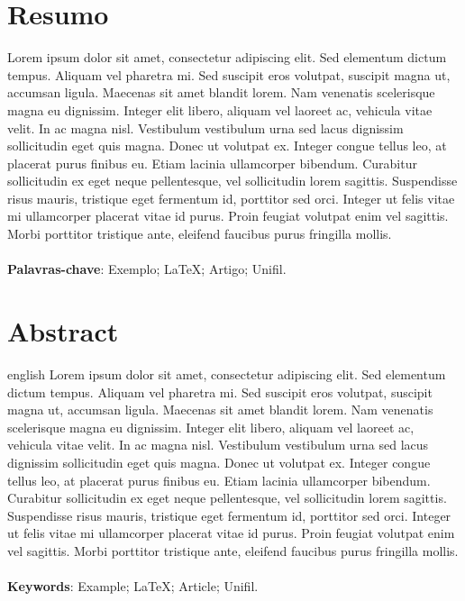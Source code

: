 \documentclass[article,12pt,oneside,a4paper,english,brazil]{unifil}
\date{}
\begin{document}
\frenchspacing
\maketitle
\normalsize

\fontsize{10}{1}\selectfont
\section*{Resumo}
Lorem ipsum dolor sit amet, consectetur adipiscing elit. Sed elementum dictum tempus. Aliquam vel pharetra mi. Sed suscipit eros volutpat, suscipit magna ut, accumsan ligula. Maecenas sit amet blandit lorem. Nam venenatis scelerisque magna eu dignissim. Integer elit libero, aliquam vel laoreet ac, vehicula vitae velit. In ac magna nisl. Vestibulum vestibulum urna sed lacus dignissim sollicitudin eget quis magna. Donec ut volutpat ex. Integer congue tellus leo, at placerat purus finibus eu. Etiam lacinia ullamcorper bibendum. Curabitur sollicitudin ex eget neque pellentesque, vel sollicitudin lorem sagittis. Suspendisse risus mauris, tristique eget fermentum id, porttitor sed orci. Integer ut felis vitae mi ullamcorper placerat vitae id purus. Proin feugiat volutpat enim vel sagittis. Morbi porttitor tristique ante, eleifend faucibus purus fringilla mollis.\\
\vspace{\onelineskip} \\
\noindent
\textbf{Palavras-chave}: Exemplo; LaTeX; Artigo; Unifil.



\section*{Abstract}
\begin{otherlanguage*}{english}
Lorem ipsum dolor sit amet, consectetur adipiscing elit. Sed elementum dictum tempus. Aliquam vel pharetra mi. Sed suscipit eros volutpat, suscipit magna ut, accumsan ligula. Maecenas sit amet blandit lorem. Nam venenatis scelerisque magna eu dignissim. Integer elit libero, aliquam vel laoreet ac, vehicula vitae velit. In ac magna nisl. Vestibulum vestibulum urna sed lacus dignissim sollicitudin eget quis magna. Donec ut volutpat ex. Integer congue tellus leo, at placerat purus finibus eu. Etiam lacinia ullamcorper bibendum. Curabitur sollicitudin ex eget neque pellentesque, vel sollicitudin lorem sagittis. Suspendisse risus mauris, tristique eget fermentum id, porttitor sed orci. Integer ut felis vitae mi ullamcorper placerat vitae id purus. Proin feugiat volutpat enim vel sagittis. Morbi porttitor tristique ante, eleifend faucibus purus fringilla mollis.\\
\vspace{\onelineskip}\\
\noindent
\textbf{Keywords}: Example; LaTeX; Article; Unifil.
\end{otherlanguage*}
\end{document}
